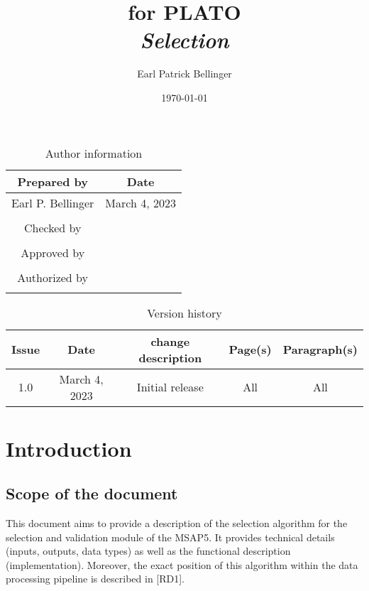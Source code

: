 \documentclass[a4paper, oneside, 11pt, article, english]{memoir}
\author{Earl Patrick Bellinger}
\title{\shorttitle{} for PLATO \\ \Large\textit{Selection}}
\date{\today}
\begin{document}
\maketitle

\begin{table}[htbp]
  \centering
  \caption{Author information}
  \label{tab:author}
  \begin{tabular}{cc}
    \toprule
    Prepared by & Date\\
    \midrule
    Earl P. Bellinger & March 4, 2023 \\
    \\
    Checked by \\
    \midrule
    \\
    Approved by \\
    \midrule
    \\
    Authorized by \\
    \midrule
    \\
    \bottomrule
  \end{tabular}
\end{table}

\begin{table}[htbp]
  \centering
  \caption{Version history}
  \label{tab:version}
  \begin{tabular}{ccccc}
    \toprule
    Issue & Date & \textnumero{} change description & Page(s) & Paragraph(s) \\
    \midrule
    1.0 & March 4, 2023 & Initial release & All & All \\
    \bottomrule
  \end{tabular}
\end{table}


\clearpage
\tableofcontents*
\clearpage


\chapter{Introduction}
\label{chap:intro}

\section{Scope of the document}
\label{sec:scope}

This document aims to provide a description of the selection algorithm for the selection and validation module of the MSAP5. 
It provides technical details (inputs, outputs, data types) as well as the
functional description (implementation). 
Moreover, the exact position of this algorithm within the data processing pipeline is described in [RD1]. 
\end{document}
